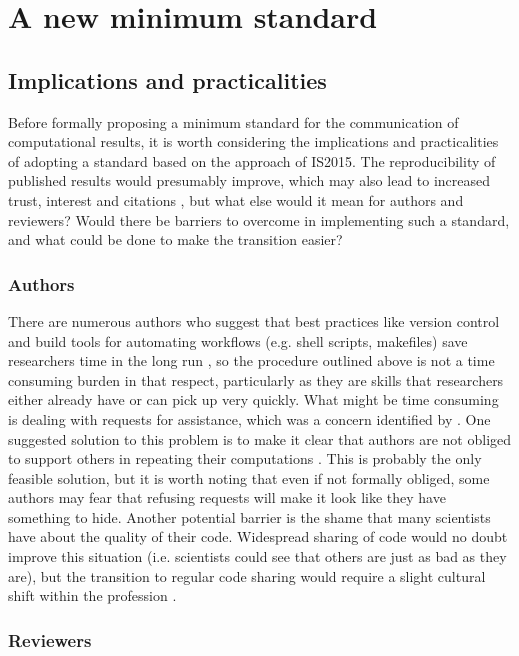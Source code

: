 \section{A new minimum standard}

\subsection{Implications and practicalities}

Before formally proposing a minimum standard for the communication of computational results, it is worth considering the implications and practicalities of adopting a standard based on the approach of IS2015. The reproducibility of published results would presumably improve, which may also lead to increased trust, interest and citations \citep{Piwowar2007}, but what else would it mean for authors and reviewers? Would there be barriers to overcome in implementing such a standard, and what could be done to make the transition easier?

\subsubsection{Authors}

There are numerous authors who suggest that best practices like version control and build tools for automating workflows (e.g. shell scripts, makefiles) save researchers time in the long run \citep[e.g.][]{Sandve2013,Wilson2014a}, so the procedure outlined above is not a time consuming burden in that respect, particularly as they are skills that researchers either already have or can pick up very quickly. What might be time consuming is dealing with requests for assistance, which was a concern identified by \citet{Stodden2010}. One suggested solution to this problem is to make it clear that authors are not obliged to support others in repeating their computations \citep{Easterbrook2014}. This is probably the only feasible solution, but it is worth noting that even if not formally obliged, some authors may fear that refusing requests will make it look like they have something to hide. Another potential barrier is the shame that many scientists have about the quality of their code. Widespread sharing of code would no doubt improve this situation (i.e. scientists could see that others are just as bad as they are), but the transition to regular code sharing would require a slight cultural shift within the profession \citep{Barnes2010}.

\subsubsection{Reviewers}


